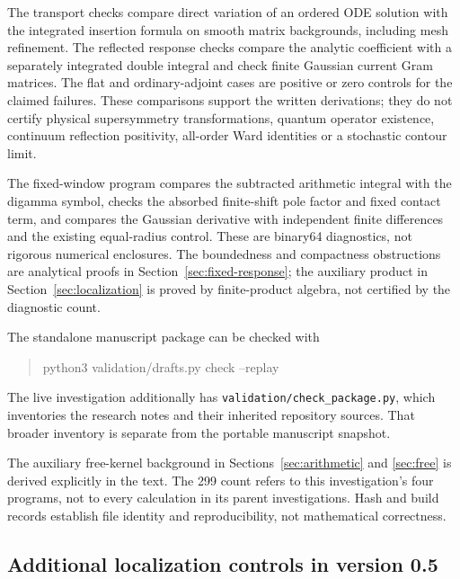 The transport checks compare direct variation of an ordered ODE
solution with the integrated insertion formula on smooth matrix
backgrounds, including mesh refinement. The reflected response
checks compare the analytic coefficient with a separately integrated
double integral and check finite Gaussian current Gram matrices.
The flat and ordinary-adjoint cases are positive or zero controls
for the claimed failures. These comparisons support the written
derivations; they do not certify physical supersymmetry transformations,
quantum operator existence, continuum reflection positivity,
all-order Ward identities or a stochastic contour limit.

The fixed-window program compares the subtracted arithmetic integral
with the digamma symbol, checks the absorbed finite-shift pole factor
and fixed contact term, and compares the Gaussian derivative with
independent finite differences and the existing equal-radius control.
These are binary64 diagnostics, not rigorous numerical enclosures.
The boundedness and compactness obstructions are analytical proofs
in Section~\ref{sec:fixed-response}; the auxiliary product in
Section~\ref{sec:localization} is proved by finite-product algebra,
not certified by the diagnostic count.

The standalone manuscript package can be checked with
\begin{quote}\ttfamily\small
python3 validation/drafts.py check --replay
\end{quote}
The live investigation additionally has
\nolinkurl{validation/check_package.py}, which inventories the
research notes and their inherited repository sources. That broader
inventory is separate from the portable manuscript snapshot.

The auxiliary free-kernel background in Sections~\ref{sec:arithmetic}
and \ref{sec:free} is derived explicitly in the text. The 299 count
refers to this investigation's four programs, not to every calculation
in its parent investigations. Hash and build records establish file
identity and reproducibility, not mathematical correctness.

\subsection{Additional localization controls in version 0.5}

